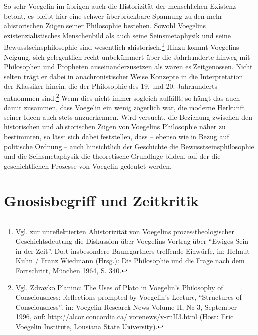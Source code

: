 So sehr Voegelin im übrigen auch die Historizität der menschlichen Existenz
betont, es bleibt hier eine schwer überbrückbare Spannung zu den mehr
ahistorischen Zügen seiner Philosophie bestehen. Sowohl Voegelins
existenzialistisches Menschenbild als auch seine Seinsmetaphysik und seine
Bewusstseinsphilosophie sind wesentlich ahistorisch.\footnote{Vgl. zur
  unreflektierten Ahistorizität von Voegelins prozesstheologischer
  Geschichtsdeutung die Diskussion über Voegelins Vortrag über "`Ewiges Sein
  in der Zeit"'. Dort insbesondere Baumgartners treffende Einwürfe, in: Helmut
  Kuhn / Franz Wiedmann (Hrsg.): Die Philosophie und die Frage nach dem
  Fortschritt, München 1964, S. 340.} Hinzu kommt Voegelins Neigung, sich
gelegentlich recht unbekümmert über die Jahrhunderte hinweg mit Philosophen
und Propheten auseinanderzusetzen als wären es Zeitgenossen. Nicht selten
trägt er dabei in anachronistischer Weise Konzepte in die Interpretation der
Klassiker hinein, die der Philosophie des 19. und 20.  Jahrhunderts entnommen
sind.\footnote{Vgl. Zdravko Planinc: The Uses of Plato in Voegelin's
  Philosophy of Con\-s\-cious\-ness: Reflections prompted by Voegelin's
  Lecture, "`Structures of Con\-s\-cious\-ness"', in: Voegelin-Re\-search News
  Volume II, No 3, September 1996, auf: http:\-//alcor.concordia.ca/\~{
  }vorenews/v-rnII3.html (Host: Eric Voegelin Institute, Lousiana State
  University).} Wenn dies nicht immer sogleich auf\/fällt, so hängt das auch
damit zusammen, dass Voegelin ein wenig zögerlich war, die moderne Herkunft
seiner Ideen auch stets anzuerkennen. Wird versucht, die Beziehung zwischen
den historischen und ahistorischen Zügen von Voegelins Philosophie näher zu
bestimmten, so lässt sich dabei feststellen, dass -- ebenso wie in Bezug auf
politische Ordnung -- auch hinsichtlich der Geschichte die
Bewusstseinsphilosophie und die Seinsmetaphysik die theoretische Grundlage
bilden, auf der die geschichtlichen Prozesse von Voegelin gedeutet werden.

\section{Gnosisbegriff und Zeitkritik}


